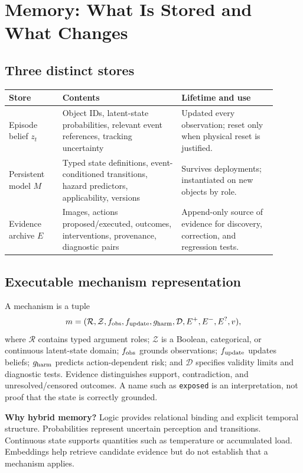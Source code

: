 \documentclass[10pt]{article}
\begin{document}
\newpage
\section{Memory: What Is Stored and What Changes}
\subsection{Three distinct stores}
\begin{center}
\small
\begin{tabular}{p{0.18\linewidth}p{0.40\linewidth}p{0.32\linewidth}}
\toprule
Store & Contents & Lifetime and use \\
\midrule
Episode belief $z_t$ & Object IDs, latent-state probabilities, relevant event references, tracking uncertainty & Updated every observation; reset only when physical reset is justified. \\
Persistent model $M$ & Typed state definitions, event-conditioned transitions, hazard predictors, applicability, versions & Survives deployments; instantiated on new objects by role. \\
Evidence archive $E$ & Images, actions proposed/executed, outcomes, interventions, provenance, diagnostic pairs & Append-only source of evidence for discovery, correction, and regression tests. \\
\bottomrule
\end{tabular}
\end{center}

\subsection{Executable mechanism representation}
A mechanism is a tuple
\[
m=(\mathcal R,\mathcal Z,f_{\rm obs},f_{\rm update},g_{\rm harm},\mathcal D,E^+,E^-,E^?,v),
\]
where $\mathcal R$ contains typed argument roles; $\mathcal Z$ is a Boolean, categorical, or continuous latent-state domain; $f_{\rm obs}$ grounds observations; $f_{\rm update}$ updates beliefs; $g_{\rm harm}$ predicts action-dependent risk; and $\mathcal D$ specifies validity limits and diagnostic tests. Evidence distinguishes support, contradiction, and unresolved/censored outcomes. A name such as \texttt{exposed} is an interpretation, not proof that the state is correctly grounded.

\textbf{Why hybrid memory?} Logic provides relational binding and explicit temporal structure. Probabilities represent uncertain perception and transitions. Continuous state supports quantities such as temperature or accumulated load. Embeddings help retrieve candidate evidence but do not establish that a mechanism applies.
\end{document}
